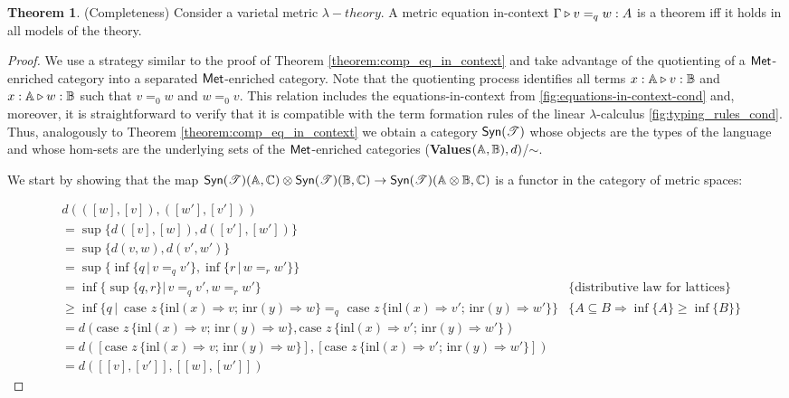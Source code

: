 \documentclass[10pt,a4paper]{amsart}
\theoremstyle{definition}
\theoremstyle{definition}
\theoremstyle{definition}
\theoremstyle{definition}
\theoremstyle{definition}
\theoremstyle{definition}
\newtheorem{theorem}[definition]{Theorem}
\begin{document}
\begin{theorem} (Completeness)
  Consider a varietal metric $\lambda-theory$. A metric equation
in-context $\Gamma \triangleright v =_q w : A$ is a theorem iff it holds in all models of the theory.
\end{theorem}
\begin{proof}
  We use a strategy similar to the proof of Theorem \ref{theorem:comp_eq_in_context} and take advantage of the quotienting of a  $\mathsf{Met}$-enriched category into a separated  $\mathsf{Met}$-enriched category.  Note that the quotienting process identifies all terms $x : \mathbb{A} \triangleright v : \mathbb{B}$ and $x : \mathbb{A} \triangleright w : \mathbb{B}$ such that $v =_0 w$ and $w =_0 v$. This relation includes the equations-in-context from \autoref{fig:equations-in-context-cond} and, moreover, it is straightforward to verify that it is compatible with the term formation rules of the linear $\lambda$-calculus \autoref{fig:typing_rules_cond}. Thus, analogously to Theorem \ref{theorem:comp_eq_in_context} we obtain a category $\mathsf{Syn}(\mathscr{T})$ whose objects are the types of the language and whose hom-sets are the underlying sets of the  $\mathsf{Met}$-enriched categories (\textbf{Values}$(\mathbb{A},\mathbb{B}),d)$/$\sim$.

  We start by showing that the map $\mathsf{Syn}(\mathscr{T})(\mathbb{A},\mathbb{C}) \otimes \mathsf{Syn}(\mathscr{T})(\mathbb{B},\mathbb{C}) \rightarrow
  \mathsf{Syn}(\mathscr{T})(\mathbb{A} \otimes \mathbb{B} ,\mathbb{C})$ is a functor in the category of metric spaces:

  \begin{align*}
    & d(([w], [v]), ([w′], [v']))  \\
    & = \sup{\{d([v],[w]),d([v'],[w']) \}}  \\
    & = \sup{\{d(v,w),d(v',w') \}} \\
    & = \sup {\{ \inf{\{q \, \vert \, v=_q v'\}},\inf{\{r \, \vert \, w=_r w'\}}  \}} \\
    & = \inf{\{ \sup \{ q, r \} \vert \, v=_q v', w=_r w' \}} & \{\text{distributive law for lattices}\} \\
    & \geq  \inf{ \{ q  \,\vert \, \text{ case } z \,   \{\text{inl} (x) \Rightarrow v ; \, \text{inr} (y) \Rightarrow w\} =_{q} \text{ case } z \,  \{\text{inl} (x) \Rightarrow v' ; \,\text{inr} (y) \Rightarrow w'\} \} } & \{ A \subseteq  B  \Rightarrow \inf{\{A\}} \geq \inf{\{B\}}  \} \\ 
    & = d(\text{case } z \,   \{\text{inl} (x) \Rightarrow v ; \, \text{inr} (y) \Rightarrow w\}, \text{case } z \,  \{\text{inl} (x) \Rightarrow v' ; \,\text{inr} (y) \Rightarrow w'\}) \\
    & = d([\text{case } z \,   \{\text{inl} (x) \Rightarrow v ; \, \text{inr} (y) \Rightarrow w\}], [\text{case } z \,  \{\text{inl} (x) \Rightarrow v' ; \,\text{inr} (y) \Rightarrow w'\}]) \\
    & = d([[v],[v']],[[w],[w']])  
  \end{align*}


\end{proof}
\end{document}
